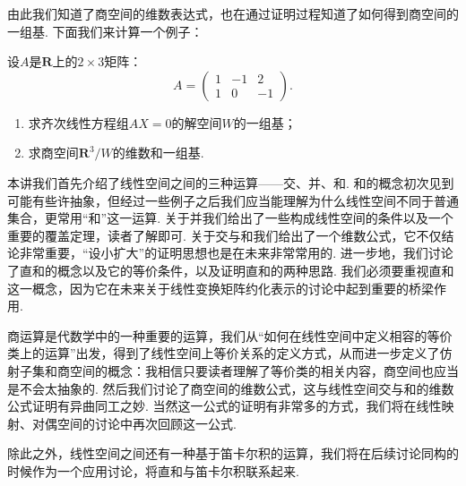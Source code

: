 由此我们知道了商空间的维数表达式，也在通过证明过程知道了如何得到商空间的一组基. 下面我们来计算一个例子：

\begin{example}{}{}
    设$A$是$\mathbf{R}$上的$2\times 3$矩阵：
    \[A=\begin{pmatrix}
            1 & -1 & 2 \\ 1 & 0 & -1
        \end{pmatrix}.\]
    \begin{enumerate}
        \item 求齐次线性方程组$AX=0$的解空间$W$的一组基；

        \item 求商空间$\mathbf{R}^3/W$的维数和一组基.
    \end{enumerate}
\end{example}

\begin{solution}

\end{solution}

\begin{summary}

    本讲我们首先介绍了线性空间之间的三种运算——交、并、和. 和的概念初次见到可能有些许抽象，但经过一些例子之后我们应当能理解为什么线性空间不同于普通集合，更常用``和''这一运算. 关于并我们给出了一些构成线性空间的条件以及一个重要的覆盖定理，读者了解即可. 关于交与和我们给出了一个维数公式，它不仅结论非常重要，``设小扩大''的证明思想也是在未来非常常用的. 进一步地，我们讨论了直和的概念以及它的等价条件，以及证明直和的两种思路. 我们必须要重视直和这一概念，因为它在未来关于线性变换矩阵约化表示的讨论中起到重要的桥梁作用.

    商运算是代数学中的一种重要的运算，我们从``如何在线性空间中定义相容的等价类上的运算''出发，得到了线性空间上等价关系的定义方式，从而进一步定义了仿射子集和商空间的概念：我相信只要读者理解了等价类的相关内容，商空间也应当是不会太抽象的. 然后我们讨论了商空间的维数公式，这与线性空间交与和的维数公式证明有异曲同工之妙. 当然这一公式的证明有非常多的方式，我们将在线性映射、对偶空间的讨论中再次回顾这一公式.

    除此之外，线性空间之间还有一种基于笛卡尔积的运算，我们将在后续讨论同构的时候作为一个应用讨论，将直和与笛卡尔积联系起来.

\end{summary}

